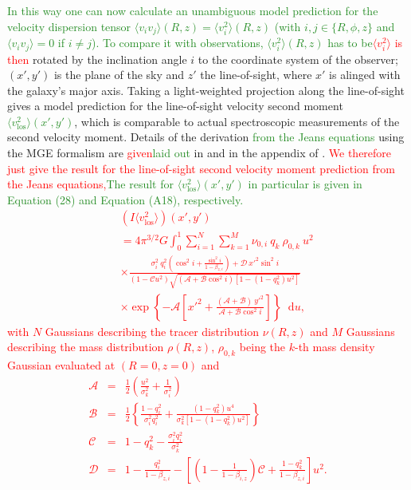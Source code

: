 \documentclass[useAMS,usenatbib]{mnras}
\newcommand*\diff{\mathop{}\!\mathrm{d}}
\newcommand{\NEW}[1]{\textcolor{ForestGreen}{#1}}
\newcommand{\OLD}[1]{\textcolor{Red}{#1}}
\begin{document}
\NEW{In this way one can now calculate an unambiguous model prediction for the velocity dispersion tensor $\langle v_i v_j \rangle(R,z) = \langle v_i^2 \rangle(R,z)$ (with $i,j \in \{ R,\phi, z\}$ and $\langle v_i v_j \rangle=0$ if $i\neq j$). To compare it with observations, $\langle v_i^2 \rangle(R,z)$ has to be}\OLD{$\langle v_i^2 \rangle$ is then} rotated by the inclination angle $i$ to the coordinate system of the observer; $(x',y')$ is the plane of the sky and $z'$ the line-of-sight, where $x'$ is alinged with the galaxy's major axis. Taking a light-weighted projection along the line-of-sight gives a model prediction for the line-of-sight velocity second moment \NEW{$\langle v_\text{los}^2\rangle(x',y')$}, which is comparable to actual spectroscopic measurements of the second velocity moment. Details of the derivation \NEW{from the Jeans equations} using the MGE formalism are \OLD{given}\NEW{laid out} in \citet{Cap08} and in the appendix of \citet{GlennEC}. \OLD{We therefore just give the result for the line-of-sight second velocity moment prediction from the Jeans equations,}\NEW{The result for $\langle v_\text{los}^2\rangle(x',y')$ in particular is given in Equation (28) and Equation (A18), respectively.}
\OLD{\begin{eqnarray}
&&\left(I \langle v_\text{los}^2\rangle\right)(x',y')\nonumber\\
&&= 4 \pi^{3/2} G \int_0^1 \sum_{i=1}^N \sum_{k=1}^M \nu_{0,i} \ q_k \ \rho_{0,k} \ u^2\nonumber\\
&& \times \frac{\sigma_i^2 \ q^{2}_i \left( \cos^2 i + \frac{\sin^2 i}{1-\beta_{z,i}}\right) + \mathscr{D} \  {x'}^{2} \sin^2 i}{(1-\mathscr{C}u^2) \sqrt{(\mathscr{A} + \mathscr{B} \cos^2 i) \left[1-(1-q^{2}_k) u^2 \right]}}\nonumber\\
&& \times \exp\left\{- \mathscr{A} \left[{x'}^{2} + \frac{(\mathscr{A}+\mathscr{B}) \ {y'}^{2}}{\mathscr{A}+\mathscr{B}\cos^2 i}\right] \right\} \diff u, \label{eq:explicitLOSvelCap}
\end{eqnarray}
with $N$ Gaussians describing the tracer distribution $\nu(R,z)$ and $M$ Gaussians describing the mass distribution $\rho(R,z)$, $\rho_{0,k}$ being the $k$-th mass density Gaussian evaluated at $(R=0,z=0)$ and
\begin{eqnarray*}
\mathscr{A} &=& \frac 12 \left(\frac{u^2}{\sigma_k^2} + \frac{1}{\sigma_i^2} \right)\nonumber\\
\mathscr{B} &=& \frac 12 \left\{\frac{1-q^{2}_i}{\sigma_i^2 q^{2}_i} + \frac{(1-q^{2}_k)u^4}{\sigma_k^2 \left[1-(1-{q}_k^{2})u^2 \right]} \right\}\nonumber\\
\mathscr{C} &=& 1- q^{2}_k - \frac{\sigma_i^2 q^{2}_i}{\sigma^2_k}\nonumber\\
\mathscr{D} &=& 1 - \frac{q^{2}_i}{1-\beta_{z,i}} - \left[ \left(1-\frac{1}{1-\beta_{i,z}}\right)\mathscr{C} + \frac{1-q^{2}_k}{1-\beta_{z,i}}\right] u^2.\nonumber
\end{eqnarray*}}
\end{document}
